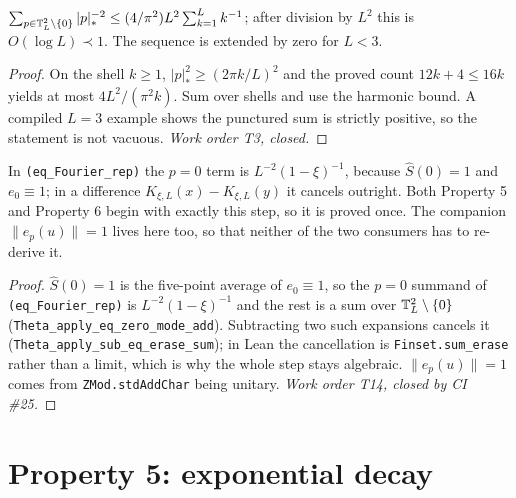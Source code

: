 \begin{lemma}\label{lem:latticesum}
  \leanok
  $\sum_{p\in\mathbb{T}_L^2\setminus\{0\}}|p|_*^{-2}
   \le(4/\pi^2)L^2\sum_{k=1}^L k^{-1}$; after division by $L^2$ this
  is $O(\log L)\prec1$.  The sequence is extended by zero for $L<3$.
\end{lemma}
\begin{proof}\leanok
  On the shell $k\ge1$, $|p|_*^2\ge(2\pi k/L)^2$ and the proved count
  $12k+4\le16k$ yields at most $4L^2/(\pi^2 k)$.  Sum over shells and use
  the harmonic bound.  A compiled $L=3$ example shows the punctured sum is
  strictly positive, so the statement is not vacuous.
  \emph{Work order T3, closed.}
\end{proof}

\begin{lemma}\label{lem:zero-mode}
  \leanok
  In \texttt{(eq\_Fourier\_rep)} the $p=0$ term is $L^{-2}(1-\xi)^{-1}$, because
  $\hat S(0)=1$ and $e_0\equiv1$; in a difference $K_{\xi,L}(x)-K_{\xi,L}(y)$ it
  cancels outright.  Both Property 5 and Property 6 begin with exactly this step,
  so it is proved once.  The companion $\|e_p(u)\|=1$ lives here too, so that
  neither of the two consumers has to re-derive it.
\end{lemma}
\begin{proof}\leanok
  $\hat S(0)=1$ is the five-point average of $e_0\equiv1$, so the $p=0$ summand of
  \texttt{(eq\_Fourier\_rep)} is $L^{-2}(1-\xi)^{-1}$ and the rest is a sum over
  $\mathbb{T}_L^2\setminus\{0\}$ (\texttt{Theta\_apply\_eq\_zero\_mode\_add}).  Subtracting two
  such expansions cancels it (\texttt{Theta\_apply\_sub\_eq\_erase\_sum}); in Lean the
  cancellation is \texttt{Finset.sum\_erase} rather than a limit, which is why the
  whole step stays algebraic.  $\|e_p(u)\|=1$ comes from
  \texttt{ZMod.stdAddChar} being unitary.
  \emph{Work order T14, closed by CI \#25.}
\end{proof}

\section{Property 5: exponential decay}

